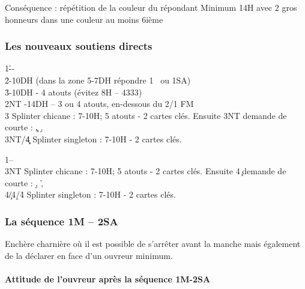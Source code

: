 \documentclass[a4paper]{article}
\begin{document}
Conséquence : répétition de la couleur du répondant
Minimum 14H avec 2 gros honneurs dans une couleur au moins 6ième

\subsubsection{Les nouveaux soutiens directs}

\begin{bidtable}
1\h--\\
2\h {}-10DH (dans la zone 5-7DH répondre 1 \s\ ou 1SA)\\
3\h {}-10DH - 4 atouts (évitez 8H – 4333)\\
2NT -14DH – 3 ou 4 atouts, en-dessous du 2/1 FM\\
3\s \> Splinter chicane : 7-10H; 5 atouts - 2 cartes clés. Ensuite 3NT demande de courte : \c , \d , \s \\
3NT/4\c\d \> Splinter singleton : 7-10H - 2 cartes clés.
\end{bidtable}

\begin{bidtable}
1\s--\\
3NT \> Splinter chicane : 7-10H; 5 atouts - 2 cartes clés. Ensuite 4\c\ demande de courte : \d , \h , \c \\
4\c/4\d/4\h \> Splinter singleton : 7-10H - 2 cartes clés.
\end{bidtable}

\subsubsection{La séquence 1M – 2SA}

Enchère charnière où il est possible de s’arrêter avant la manche mais également de la déclarer en 
face d’un ouvreur minimum.

\paragraph{Attitude de l’ouvreur après la séquence 1M-2SA}
\end{document}
